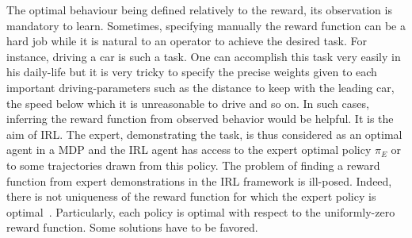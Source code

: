 \documentclass[tablecaption=bottom]{jmlr}
\begin{document}
%
The optimal behaviour being defined relatively to the reward, its
observation is mandatory to learn. Sometimes, specifying manually
the reward function can be a hard job while it is natural to an
operator to achieve the desired task. For instance, driving a car is
such a task. One can accomplish this task very easily in his
daily-life but it is very tricky to specify the precise weights
given to each important driving-parameters such as the distance to
keep with the leading car, the speed below which it is unreasonable
to drive and so on. In such cases, inferring the reward function
from observed behavior would be helpful.
%
%
It is the aim of IRL. The expert, demonstrating the task, is thus
considered as an optimal agent in a MDP and the IRL agent has access
to the expert optimal policy $\pi_E$ or to some trajectories drawn
from this policy.
%
The problem of finding a reward function from expert demonstrations
in the IRL framework is ill-posed. Indeed, there is not uniqueness
of the reward function for which the expert policy is
optimal~\cite{ng1999policy}. Particularly, each policy is
optimal with respect to the uniformly-zero reward function. Some
solutions have to be favored.
\end{document}
